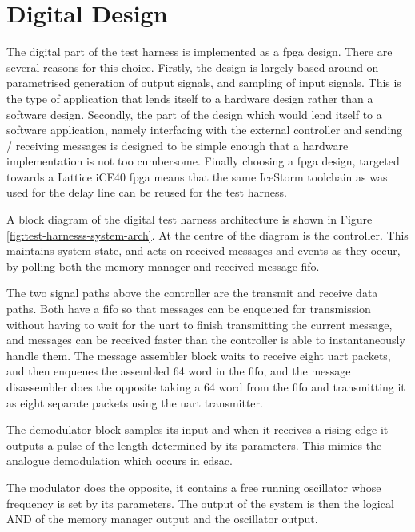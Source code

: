 \section{Digital Design} \label{sec:test-harness-dig}

The digital part of the test harness is implemented as a \gls{fpga} design. There are several reasons for this choice. Firstly, the design is largely based around on parametrised generation of output signals, and sampling of input signals. This is the type of application that lends itself to a hardware design rather than a software design. Secondly, the part of the design which would lend itself to a software application, namely interfacing with the external controller and sending / receiving messages is designed to be simple enough that a hardware implementation is not too cumbersome. Finally choosing a \gls{fpga} design, targeted towards a Lattice iCE40 \gls{fpga} means that the same IceStorm toolchain as was used for the delay line can be reused for the test harness.

A block diagram of the digital test harness architecture is shown in Figure \ref{fig:test-harnesss-system-arch}. At the centre of the diagram is the controller. This maintains system state, and acts on received messages and events as they occur, by polling both the memory manager and received message \gls{fifo}.

The two signal paths above the controller are the transmit and receive data paths. Both have a \gls{fifo} so that messages can be enqueued for transmission without having to wait for the \gls{uart} to finish transmitting the current message, and messages can be received faster than the controller is able to instantaneously handle them. The message assembler block waits to receive eight \gls{uart} packets, and then enqueues the assembled \SI{64}{\bit} word in the \gls{fifo}, and the message disassembler does the opposite taking a \SI{64}{\bit} word from the \gls{fifo} and transmitting it as eight separate packets using the \gls{uart} transmitter.

The demodulator block samples its input and when it receives a rising edge it outputs a pulse of the length determined by its parameters. This mimics the analogue demodulation which occurs in \gls{edsac}.

The modulator does the opposite, it contains a free running oscillator whose frequency is set by its parameters. The output of the system is then the logical AND of the memory manager output and the oscillator output.

